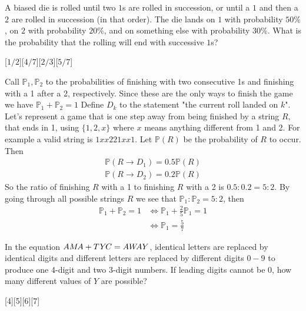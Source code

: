 \begin{problem}
     A biased die is rolled until two $1$s are rolled in succession, or until a $1$ and then a $2$ are rolled in succession (in that order). The die lands on $1$ with probability $50\%$, on $2$ with probability $20\%$, and on something else with probability $30\%$. What is the probability that the rolling will end with successive $1$s?
\end{problem}
[$1/2$][$4/7$][$2/3$][$5/7$]
\begin{solution}[E]
    Call $\mathbb{P}_1, \mathbb{P}_2$ to the probabilities of finishing with two consecutive 1s and finishing with a 1 after a 2, respectively. Since these are the only ways to finish the game we have $\mathbb{P}_1+\mathbb{P}_2=1$ Define $D_k$ to the statement "the current roll landed on $k$". Let's represent a game that is one step away from being finished by a string $R$, that ends in 1, using $\{1,2,x\}$ where $x$ means anything different from 1 and 2. For example a valid string is $1xx221xx1$. Let $\mathbb{P}(R)$ be the probability of $R$ to occur. Then 
    \begin{align*}
        \mathbb{P}(R \rightarrow D_1) = 0.5\mathbb{P}(R)\\
        \mathbb{P}(R \rightarrow D_2) = 0.2\mathbb{P}(R)
    \end{align*}
    So the ratio of finishing $R$ with a 1 to finishing $R$ with a 2 is $0.5 : 0.2 = 5:2$. By going through all possible strings $R$ we see that $\mathbb{P}_1 : \mathbb{P}_2 = 5:2$, then 
    \begin{align*}
        \mathbb{P}_1+\mathbb{P}_2 = 1 &\iff \mathbb{P}_1+\frac{2}{5}\mathbb{P}_1=1 \\
        &\iff \mathbb{P}_1 = \boxed{\frac{5}{7}}
    \end{align*}
\end{solution}

\begin{problem}
    In the equation $A\mkern0mu M\mkern-2mu A + T\mkern1mu Y\mkern-2mu C= A\mkern0mu W\mkern-4mu A\mkern0mu Y$, identical letters are replaced by identical digits and different letters are replaced by different digits $0-9$ to produce one 4-digit and two 3-digit numbers. If leading digits cannot be $0$, how many different values of $Y$ are possible?
\end{problem}
[4][5][6][7]



